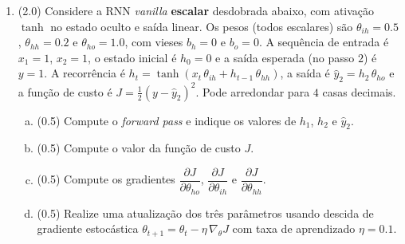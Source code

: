 \documentclass[11pt,a4paper]{article}
\begin{document}
\begin{enumerate}[1)]
\pagebreak

\item (2.0) Considere a RNN \textit{vanilla} \textbf{escalar} desdobrada abaixo, com ativação $\tanh$ no estado oculto e saída linear. Os pesos (todos escalares) são $\theta_{ih} = 0.5$, $\theta_{hh} = 0.2$ e $\theta_{ho} = 1.0$, com vieses $b_h = 0$ e $b_o = 0$. A sequência de entrada é $x_1 = 1$, $x_2 = 1$, o estado inicial é $h_0 = 0$ e a saída esperada (no passo $2$) é $y = 1$. A recorrência é $h_t = \tanh(x_t\,\theta_{ih} + h_{t-1}\,\theta_{hh})$, a saída é $\hat{y}_2 = h_2\,\theta_{ho}$ e a função de custo é $J = \tfrac{1}{2}(y - \hat{y}_2)^2$. Pode arredondar para $4$ casas decimais.

\begin{center}
\end{center}

\begin{enumerate}[a)]
    \item (0.5) Compute o \textit{forward pass} e indique os valores de $h_1$, $h_2$ e $\hat{y}_2$.
    \vspace{2.2cm}

    \item (0.5) Compute o valor da função de custo $J$.
    \vspace{1.6cm}

    \item (0.5) Compute os gradientes $\dfrac{\partial J}{\partial \theta_{ho}}$, $\dfrac{\partial J}{\partial \theta_{ih}}$ e $\dfrac{\partial J}{\partial \theta_{hh}}$.
    \vspace{3.2cm}

    \item (0.5) Realize uma atualização dos três parâmetros usando descida de gradiente estocástica $\theta_{t+1} = \theta_t - \eta\,\nabla_\theta J$ com taxa de aprendizado $\eta = 0.1$.
    \vspace{2cm}
\end{enumerate}

\end{enumerate}
\end{document}

